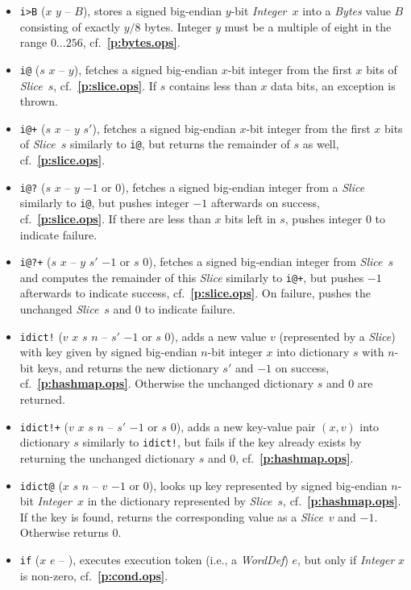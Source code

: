 \documentclass[12pt,oneside]{article}
\def\refpoint#1{{\rm\textbf{\ref{#1}}}}
\let\ptref=\refpoint
\begin{document}
\begin{itemize}
\item {\tt i>B} ($x$ $y$ -- $B$), stores a signed big-endian $y$-bit {\em Integer\/}~$x$ into a {\em Bytes\/} value $B$ consisting of exactly $y/8$ bytes. Integer $y$ must be a multiple of eight in the range $0\ldots256$, cf.~\ptref{p:bytes.ops}.
\item {\tt i@} ($s$ $x$ -- $y$), fetches a signed big-endian $x$-bit integer from the first $x$ bits of {\em Slice}~$s$, cf.~\ptref{p:slice.ops}. If $s$ contains less than $x$ data bits, an exception is thrown.
\item {\tt i@+} ($s$ $x$ -- $y$ $s'$), fetches a signed big-endian $x$-bit integer from the first $x$ bits of {\em Slice}~$s$ similarly to {\tt i@}, but returns the remainder of $s$ as well, cf.~\ptref{p:slice.ops}.
\item {\tt i@?} ($s$ $x$ -- $y$ $-1$ or $0$), fetches a signed big-endian integer from a {\em Slice\/} similarly to {\tt i@}, but pushes integer $-1$ afterwards on success, cf.~\ptref{p:slice.ops}. If there are less than $x$ bits left in $s$, pushes integer $0$ to indicate failure.
\item {\tt i@?+} ($s$ $x$ -- $y$ $s'$ $-1$ or $s$ $0$), fetches a signed big-endian integer from {\em Slice\/}~$s$ and computes the remainder of this {\em Slice\/} similarly to {\tt i@+}, but pushes $-1$ afterwards to indicate success, cf.~\ptref{p:slice.ops}. On failure, pushes the unchanged {\em Slice\/}~$s$ and $0$ to indicate failure.
\item {\tt idict!} ($v$ $x$ $s$ $n$ -- $s'$ $-1$ or $s$ $0$), adds a new value $v$ (represented by a {\em Slice\/}) with key given by signed big-endian $n$-bit integer $x$ into dictionary $s$ with $n$-bit keys, and returns the new dictionary $s'$ and $-1$ on success, cf.~\ptref{p:hashmap.ops}. Otherwise the unchanged dictionary $s$ and $0$ are returned.
\item {\tt idict!+} ($v$ $x$ $s$ $n$ -- $s'$ $-1$ or $s$ $0$), adds a new key-value pair $(x,v)$ into dictionary $s$ similarly to {\tt idict!}, but fails if the key already exists by returning the unchanged dictionary $s$ and $0$, cf.~\ptref{p:hashmap.ops}.
\item {\tt idict@} ($x$ $s$ $n$ -- $v$ $-1$ or $0$), looks up key represented by signed big-endian $n$-bit {\em Integer\/}~$x$ in the dictionary represented by {\em Slice\/}~$s$, cf.~\ptref{p:hashmap.ops}. If the key is found, returns the corresponding value as a {\em Slice\/}~$v$ and $-1$. Otherwise returns $0$.
\item {\tt if} ($x$ $e$ -- ), executes execution token (i.e., a {\em WordDef\/}) $e$, but only if {\em Integer\/} $x$ is non-zero, cf.~\ptref{p:cond.ops}.

\end{itemize}
\end{document}
